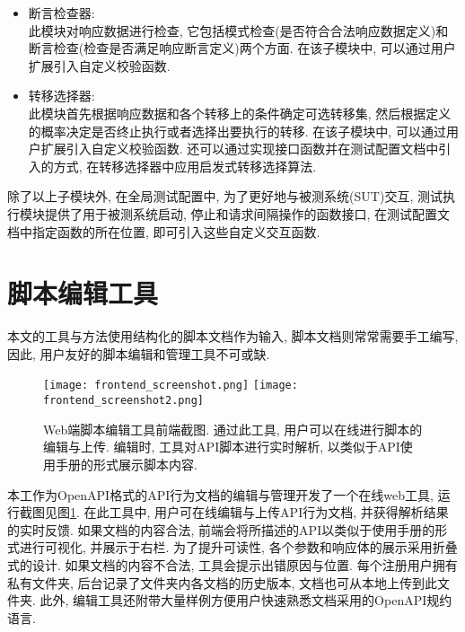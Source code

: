 \begin{itemize}
	            \item 断言检查器:\\
	                此模块对响应数据进行检查, 它包括模式检查(是否符合合法响应数据定义)和断言检查(检查是否满足响应断言定义)两个方面. 在该子模块中, 可以通过用户扩展引入自定义校验函数.
	                
	            \item 转移选择器:\\
	                此模块首先根据响应数据和各个转移上的条件确定可选转移集, 然后根据定义的概率决定是否终止执行或者选择出要执行的转移. 在该子模块中, 可以通过用户扩展引入自定义校验函数. 还可以通过实现接口函数并在测试配置文档中引入的方式, 在转移选择器中应用启发式转移选择算法.
	        \end{itemize}
	    
	        除了以上子模块外, 在全局测试配置中, 为了更好地与被测系统(SUT)交互, 测试执行模块提供了用于被测系统启动, 停止和请求间隔操作的函数接口, 在测试配置文档中指定函数的所在位置, 即可引入这些自定义交互函数.

	\section{脚本编辑工具}

        本文的工具与方法使用结构化的脚本文档作为输入, 脚本文档则常常需要手工编写, 因此, 用户友好的脚本编辑和管理工具不可或缺.
        
        \begin{figure}[!htb]
            \centering
            \texttt{[image: frontend\_screenshot.png]}
            \texttt{[image: frontend\_screenshot2.png]}
            \caption{Web端脚本编辑工具前端截图. 通过此工具, 用户可以在线进行脚本的编辑与上传. 编辑时, 工具对API脚本进行实时解析, 以类似于API使用手册的形式展示脚本内容.}
            \label{fig:frontend_screenshot}
        \end{figure}
        
        本工作为OpenAPI格式的API行为文档的编辑与管理开发了一个在线web工具, 运行截图见图\ref{fig:frontend_screenshot}. 在此工具中, 用户可在线编辑与上传API行为文档, 并获得解析结果的实时反馈. 如果文档的内容合法, 前端会将所描述的API以类似于使用手册的形式进行可视化, 并展示于右栏. 为了提升可读性, 各个参数和响应体的展示采用折叠式的设计. 如果文档的内容不合法, 工具会提示出错原因与位置. 每个注册用户拥有私有文件夹, 后台记录了文件夹内各文档的历史版本, 文档也可从本地上传到此文件夹. 此外, 编辑工具还附带大量样例方便用户快速熟悉文档采用的OpenAPI规约语言.
        
